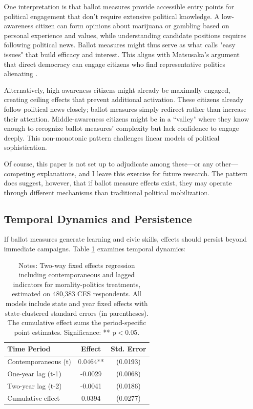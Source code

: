 \documentclass[12pt,letterpaper,oneside]{book}
\begin{document}
One interpretation is that ballot measures provide accessible entry points for political engagement that don't require extensive political knowledge. A low-awareness citizen can form opinions about marijuana or gambling based on personal experience and values, while understanding candidate positions requires following political news. Ballot measures might thus serve as what \citet{zaller1992nature} calls "easy issues" that build efficacy and interest. This aligns with Matsusaka's argument that direct democracy can engage citizens who find representative politics alienating \citep{matsusaka2020let}.

Alternatively, high-awareness citizens might already be maximally engaged, creating ceiling effects that prevent additional activation. These citizens already follow political news closely; ballot measures simply redirect rather than increase their attention. Middle-awareness citizens might be in a ``valley" where they know enough to recognize ballot measures' complexity but lack confidence to engage deeply. This non-monotonic pattern challenges linear models of political sophistication.

Of course, this paper is not set up to adjudicate among these---or any other---competing explanations, and I leave this exercise for future research. The pattern does suggest, however, that if ballot measure effects exist, they may operate through different mechanisms than traditional political mobilization.

\subsection{Temporal Dynamics and Persistence}

If ballot measures generate learning and civic skills, effects should persist beyond immediate campaigns. Table \ref{tab:persistence} examines temporal dynamics:

\begin{table}[H]
\centering
\caption{Persistence of Effects}
\label{tab:persistence}
\caption*{\footnotesize Notes: Two-way fixed effects regression including contemporaneous and lagged indicators for morality-politics treatments, estimated on 480{,}383 CES respondents. All models include state and year fixed effects with state-clustered standard errors (in parentheses). The cumulative effect sums the period-specific point estimates. Significance: ** p$<$0.05.}
\begin{tabular}{lcc}
\hline\hline
Time Period & Effect & Std. Error \\
\hline
Contemporaneous (t) & 0.0464** & (0.0193) \\
One-year lag (t-1) & -0.0029 & (0.0068) \\
Two-year lag (t-2) & -0.0041 & (0.0186) \\
\hline
Cumulative effect & 0.0394 & (0.0277) \\
\hline\hline
\end{tabular}
\end{table}
\end{document}
